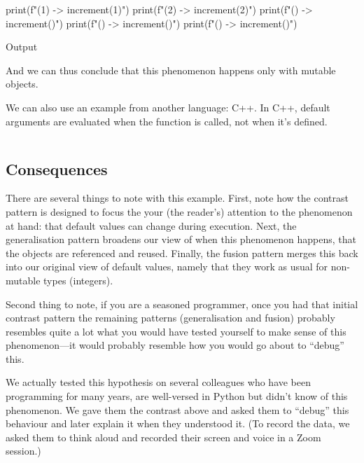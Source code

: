 \begin{description}
\begin{frame}[fragile]
\begin{pyblock}[default1]
print(f"(1) -> {increment(1)}")
print(f"(2) -> {increment(2)}")
print(f"()  -> {increment()}")
print(f"()  -> {increment()}")
print(f"()  -> {increment()}")
    \end{pyblock}
    \begin{block}{Output}\printpythontex[verbatim][highlightlines={3-5}]\end{block}
    \end{frame}

    And we can thus conclude that this phenomenon happens only with mutable 
    objects.

    We can also use an example from another language: C++.
    In C++, default arguments are evaluated when the function is called, not 
    when it's defined.
    \begin{frame}[fragile]
      \inputminted[firstline=3]{cpp}{examples/experiment5.cpp}
    \end{frame}
\end{description}

\subsection{Consequences}

There are several things to note with this example.
First, note how the contrast pattern is designed to focus the your (the 
reader's) attention to the phenomenon at hand: that default values can change 
during execution.
Next, the generalisation pattern broadens our view of when this phenomenon 
happens, that the objects are referenced and reused.
Finally, the fusion pattern merges this back into our original view of default 
values, namely that they work as usual for non-mutable types (\eg integers).

Second thing to note, if you are a seasoned programmer, once you had that 
initial contrast pattern the remaining patterns (generalisation and fusion) 
probably resembles quite a lot what you would have tested yourself to make 
sense of this phenomenon---it would probably resemble how you would go about to 
\enquote{debug} this.

We actually tested this hypothesis on several colleagues who have been 
programming for many years, are well-versed in Python but didn't know of this 
phenomenon.
We gave them the contrast above and asked them to \enquote{debug} this 
behaviour and later explain it when they understood it.
(To record the data, we asked them to think aloud and recorded their screen and 
voice in a Zoom session.)

